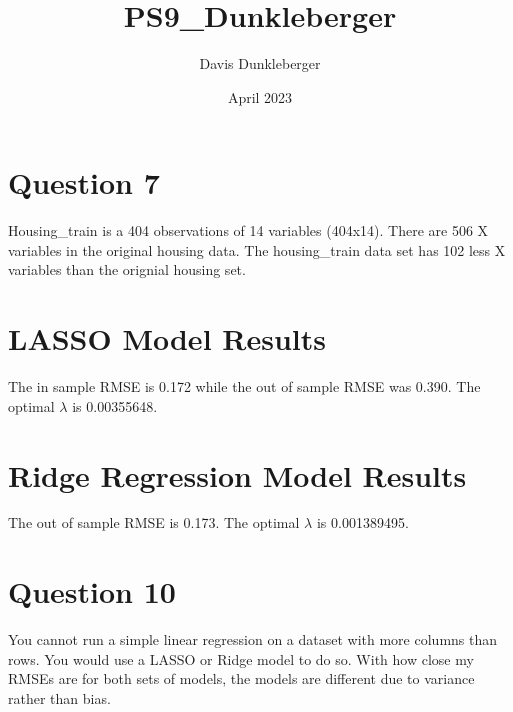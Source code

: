 \documentclass{article}
\title{PS9\_Dunkleberger}
\author{Davis Dunkleberger}
\date{April 2023}
\begin{document}
\maketitle

\section{Question 7}
Housing\_train is a 404 observations of 14 variables (404x14). There are 506 X variables in the original housing data. The housing\_train data set has 102 less X variables than the orignial housing set.  

\section{LASSO Model Results}
The in sample RMSE is 0.172 while the out of sample RMSE was 0.390. The optimal $\lambda$ is 0.00355648.  

\section{Ridge Regression Model Results}
The out of sample RMSE is 0.173. The optimal $\lambda$ is 0.001389495.

\section{Question 10}
You cannot run a simple linear regression on a dataset with more columns than rows. You would use a LASSO or Ridge model to do so. With how close my RMSEs are for both sets of models, the models are different due to variance rather than bias. 
\end{document}
